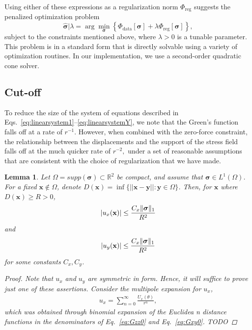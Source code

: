 \documentclass[aps,prl,reprint,twocolumn,groupedaddress,showpacs]{revtex4-1}
\newtheorem{lem}[thm]{Lemma}%
\DeclarePairedDelimiter{\norm}{\lVert}{\rVert}
\newcommand{\bsigma}{{\boldsymbol\sigma}}
\begin{document}
Using either of these expressions as a regularization norm $\Phi_{\textrm{reg}}$ suggests the penalized optimization problem
\begin{equation}
\hat{\bsigma} \big\vert \lambda = \arg\min_{\bsigma} \left\{ \Phi_{\textrm{data}}[\bsigma] + \lambda\Phi_{\textrm{reg}}[\bsigma] \right\},\label{eq:objective}
\end{equation}
subject to the constraints mentioned above,
where $\lambda>0$ is a tunable parameter. This problem
 is in a standard form that is directly solvable using a variety of optimization routines.
  In our implementation, we use a second-order  quadratic cone solver. 
\subsection{Cut-off}
To reduce the size of the system of equations described in Eqs.~\ref{eq:linearsystem1}--\ref{eq:linearsystemY}, we note that the Green's function falls off at a rate of $r^{-1}$. However,
when combined with the zero-force constraint, the relationship between the displacements
and the support of the stress field falls off at the much quicker rate of $r^{-2},$ under a
set of reasonable assumptions that are consistent with the choice of regularization that we have
made.

\begin{lem} 
      \label{lem:main}
Let $\Omega = supp(\bsigma)\subset \mathbb{R}^2$ be compact, and assume that $\bsigma\in L^1(\Omega)$. For a fixed $\mathbf{x}\not\in\Omega$, denote $D(\mathbf{x}) = \inf\{ || \mathbf{x} -\mathbf{y}|| : \mathbf{y}\in\Omega \}$. Then, for $\mathbf{x}$ where $D(\mathbf{x})\geq R>0$, 
\begin{equation}
\vert u_x(\mathbf{x}) \vert \leq \frac{C_x\norm{\bsigma}_1}{R^2}
\end{equation}      
and
\begin{equation}
\vert u_y(\mathbf{x}) \vert \leq \frac{C_x\norm{\bsigma}_1}{R^2}
\end{equation}      
for some constants $C_x,C_y$.

\begin{proof}
Note that $u_x$ and $u_y$ are symmetric in form. Hence, it will suffice to prove just one of these assertions. Consider the multipole expansion for $u_x$, 
\begin{align}
u_x =\sum_{n=0}^\infty \frac{U_x(\theta)}{r^n},
\end{align}
which was obtained through binomial expansion of the Euclidea n distance functions in the denominators of Eq.~\ref{eq:Gzz0} and Eq.~\ref{eq:Gxy0}. TODO
\end{proof}
      
\end{lem}
\end{document}
